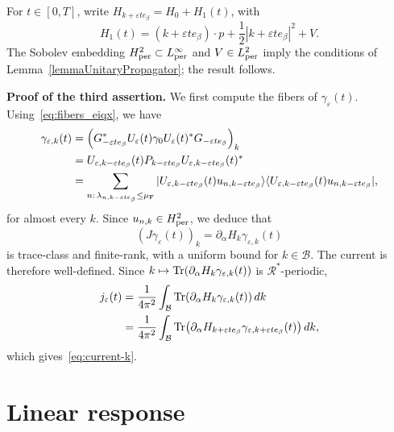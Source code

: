 \documentclass[a4paper,11pt]{article}
\theoremstyle{plain}
\theoremstyle{remark}
\def\eps{{\varepsilon}}
\def\cB{{\mathcal B}}
\def\cR{{\mathcal R}}
\begin{document}
\medskip

For $t\in[0,T]$, write $H_{k+\eps te_\beta}=H_0+H_1(t)$, with
\[
H_1(t)=(k+\eps te_\beta)\cdot p+\frac12|k+\eps te_\beta|^2+V.
\]
The Sobolev embedding $H^2_{\rm per}\subset L^\infty_{\rm per}$ and
$V\in L^2_{\rm per}$ imply the conditions of
Lemma~\ref{lemmaUnitaryPropagator}; the result follows.


\noindent
{\bf Proof of the third assertion.} We first compute the fibers of
$\gamma_\eps(t)$. Using~\eqref{eq:fibers_eiqx}, we have
\begin{align}
\gamma_{\eps,k}(t)
&=\left(G_{-\eps te_\beta}^*U_\eps(t)\gamma_0U_\eps(t)^*G_{-\eps te_\beta}\right)_k\\
&=U_{\eps,k-\eps te_\beta}(t)P_{k-\eps te_\beta}
 U_{\eps,k-\eps te_\beta}(t)^*\label{eq:gebkt}\\
&=\sum_{n:\,\lambda_{n,k-\eps te_\beta}\le\mu_{\rm F}}
 |U_{\eps,k-\eps te_\beta}(t)u_{n,k-\eps te_\beta}\rangle
 \langle U_{\eps,k-\eps te_\beta}(t)u_{n,k-\eps te_\beta}|,\nonumber
\end{align}
for almost every $k$. Since $u_{n,k}\in H^2_{\rm per}$, we deduce that
\[
(J\gamma_\eps(t))_k=\partial_\alpha H_k\gamma_{\eps,k}(t)
\]
is trace-class and finite-rank, with a uniform bound for $k\in\cB$.
The current is therefore well-defined. Since
$k\mapsto\Tr(\partial_\alpha H_k\gamma_{\eps,k}(t))$ is $\cR^*$-periodic,
\begin{align*}
j_\eps(t)
&=\frac1{4\pi^2}\int_\cB\Tr(\partial_\alpha H_k\gamma_{\eps,k}(t))\,dk\\
&=\frac1{4\pi^2}\int_\cB\Tr(\partial_\alpha H_{k+\eps te_\beta}
\gamma_{\eps,k+\eps te_\beta}(t))\,dk,
\end{align*}
which gives~\eqref{eq:current-k}.


\section{Linear response}\label{sec:linear-response}
\end{document}
